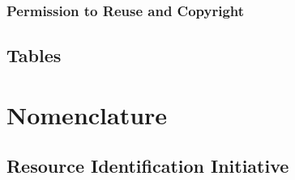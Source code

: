 \documentclass[utf8]{frontiersSCNS} %
\begin{document}
\subsubsection{Permission to Reuse and Copyright}

\subsection{Tables}

\section{Nomenclature}

\subsection{Resource Identification Initiative}
\end{document}
